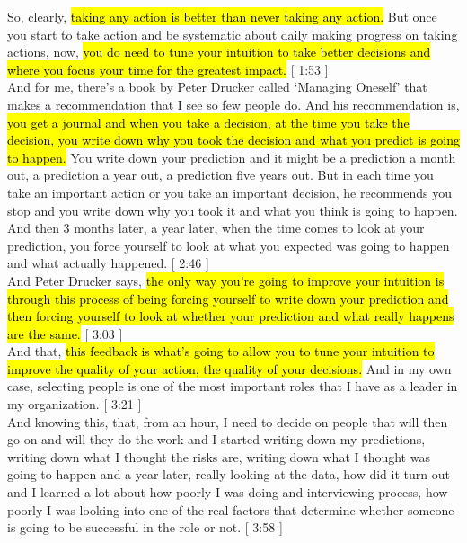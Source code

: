 \documentclass[a4paper,12pt]{article}
\begin{document}
So, clearly, \hl{taking any action is better than never taking any action.} But once you start to take action and be systematic about daily making progress on taking actions, now, \hl{you do need to tune your intuition to take better decisions and where you focus your time for the greatest impact.} [ 1:53 ] \\

And for me, there's a book by Peter Drucker called `Managing Oneself' that makes a recommendation that I see so few people do. And his recommendation is, \hl{you get a journal and when you take a decision, at the time you take the decision, you write down why you took the decision and what you predict is going to happen.} You write down your prediction and it might be a prediction a month out, a prediction a year out, a prediction five years out. But in each time you take an important action or you take an important decision, he recommends you stop and you write down why you took it and what you think is going to happen. And then 3 months later, a year later, when the time comes to look at your prediction, you force yourself to look at what you expected was going to happen and what actually happened. [ 2:46 ] \\

And Peter Drucker says, \hl{the only way you're going to improve your intuition is through this process of being forcing yourself to write down your prediction and then forcing yourself to look at whether your prediction and what really happens are the same.} [ 3:03 ] \\

And that, \hl{this feedback is what's going to allow you to tune your intuition to improve the quality of your action, the quality of your decisions.} And in my own case, selecting people is one of the most important roles that I have as a leader in my organization. [ 3:21 ] \\

And knowing this, that, from an hour, I need to decide on people that will then go on and will they do the work and I started writing down my predictions, writing down what I thought the risks are, writing down what I thought was going to happen and a year later, really looking at the data, how did it turn out and I learned a lot about how poorly I was doing and interviewing process, how poorly I was looking into one of the real factors that determine whether someone is going to be successful in the role or not. [ 3:58 ] \\
\end{document}
